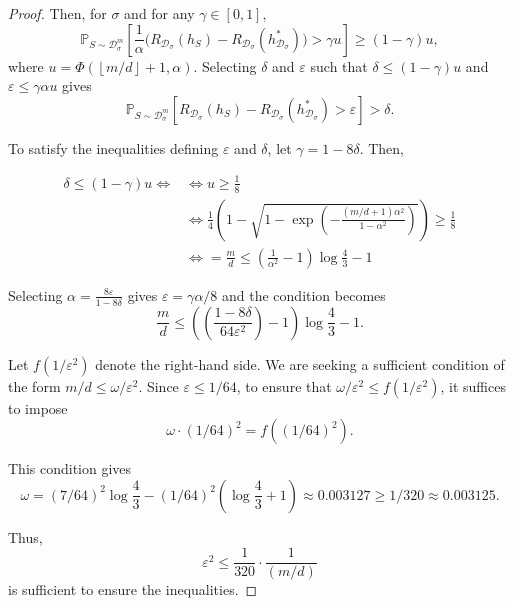 \begin{proof}
Then, for $\sigma$ and for any $\gamma\in\left[0,1\right]$,
\begin{equation}
\mathbb{P}_{S\sim\mathcal{D}_{\sigma}^{m}}\left[\frac{1}{\alpha}\bigl(R_{\mathcal{D}_{\sigma}}(h_S)-R_{\mathcal{D}_{\sigma}}(h^{\ast}_{\mathcal{D}_{\sigma}})\bigr)>\gamma u\right]\ge (1-\gamma)u,
\end{equation}
where $u=\Phi\left(\left\lfloor m/d\right\rfloor+1,\alpha\right)$. Selecting $\delta$ and $\varepsilon$ such that $\delta\le (1-\gamma)u$ and $\varepsilon\le \gamma\alpha u$ gives
\begin{equation}
\mathbb{P}_{S\sim\mathcal{D}_{\sigma}^{m}}\left[R_{\mathcal{D}_{\sigma}}(h_S)-R_{\mathcal{D}_{\sigma}}(h^{\ast}_{\mathcal{D}_{\sigma}})>\varepsilon\right]>\delta.
\end{equation}

To satisfy the inequalities defining $\varepsilon$ and $\delta$, let $\gamma=1-8\delta$. Then,

\begin{align}
    \delta\le (1-\gamma)u \Longleftrightarrow & \Leftrightarrow u\ge \frac{1}{8}\\
    & \Leftrightarrow \frac{1}{4}\left(1-\sqrt{1-\exp\!\left(-\frac{(m/d+1)\alpha^{2}}{1-\alpha^{2}}\right)}\right)\ge \frac{1}{8} \\
    & \Leftrightarrow =\frac{m}{d}\le \left(\frac{1}{\alpha^{2}}-1\right)\log\frac{4}{3}-1 
\end{align}

Selecting $\alpha=\frac{8\varepsilon}{1-8\delta}$ gives $\varepsilon=\gamma\alpha/8$ and the condition becomes
\begin{equation}
\frac{m}{d}\le \left(\left(\frac{1-8\delta}{64\varepsilon^{2}}\right)-1\right)\log\frac{4}{3}-1.
\end{equation}

Let $f\left(1/\varepsilon^{2}\right)$ denote the right-hand side. We are seeking a sufficient condition of the form $m/d\le \omega/\varepsilon^{2}$. Since $\varepsilon\le 1/64$, to ensure that $\omega/\varepsilon^{2}\le f\left(1/\varepsilon^{2}\right)$, it suffices to impose
\begin{equation}
\omega\cdot\left(1/64\right)^{2} = f\!\left(\left(1/64\right)^{2}\right).
\end{equation}

This condition gives
\begin{equation}
\omega=\left(7/64\right)^{2}\log\frac{4}{3}-\left(1/64\right)^{2}\left(\log\frac{4}{3}+1\right)\approx 0.003127 \ge 1/320\approx 0.003125.
\end{equation}

Thus,
\begin{equation}
\varepsilon^{2}\le \frac{1}{320}\cdot\frac{1}{(m/d)}
\end{equation}
is sufficient to ensure the inequalities. 
\end{proof}


